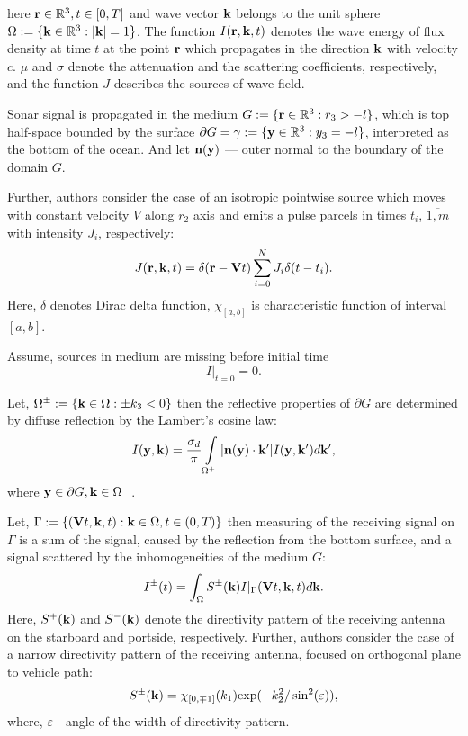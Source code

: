\documentclass{procDDs}
\begin{document}
here $\mathbf{r} \in \mathbb{R}^3, t \in [0, T]$ and wave vector $\mathbf{k}$ belongs to the unit sphere $\Omega := \{\mathbf{k} \in \mathbb{R}^3: |\mathbf{k}| = 1\}$. The function $I(\mathbf{r},\mathbf{k}, t)$ denotes the wave energy of flux density at time $t$  at the point $\mathbf{r}$ which propagates in the direction $\mathbf{k}$  with velocity $c$. $\mu$ and $\sigma$ denote the attenuation and the scattering coefficients, respectively, and the function $J$ describes the sources of wave field.

Sonar signal is propagated in the medium $G:=\{\mathbf{r} \in \mathbb{R}^3:r_3 > -l\}$, which is top half-space bounded by the surface $\partial G = \gamma := \{\mathbf{y} \in \mathbb{R}^3: y_3 = -l \}$, interpreted as the bottom of the ocean. And let $\textbf{n}(\mathbf{y})$ --- outer normal to the boundary of the domain $G$. 

Further, authors consider the case of an isotropic pointwise source which moves with constant velocity $V$ along $r_2$ axis and emits a pulse parcels in times $t_i$, $\overline{1,m}$ with intensity $J_i$, respectively: 
\begin{equation}
\label{source}
J(\mathbf{r},\mathbf{k}, t) = \delta(\mathbf{r} - \mathbf{V} t)\sum\limits_{i=0}^{N} J_i \delta(t-t_i).
\end{equation}
Here, $\delta$ denotes Dirac delta function, $\chi_{[a,b]}$ is characteristic function of interval $[a,b]$.

Assume, sources in medium are missing before initial time
\begin{equation}
\label{init_cond}
I\rvert_{t=0}=0.
\end{equation}

Let, $\Omega^\pm := \{\mathbf{k} \in \Omega: \pm k_3 < 0\}$ then the reflective properties of $\partial G$  are determined by diffuse reflection by the Lambert’s cosine law:
\begin{equation}
\label{boundary_condition}
I(\mathbf{y},\mathbf{k}) = \frac{\sigma_d}{\pi} \int\limits_{\Omega ^+}|\mathbf{n}(\mathbf{y})\cdot \mathbf{k}'| I(\mathbf{y},\mathbf{k}') d\mathbf{k}' ,
\end{equation}
where  $\mathbf{y} \in \partial G, \mathbf{k} \in \Omega^-$.


Let, $\Gamma := \{ (\mathbf{V}t, \mathbf{k}, t): \mathbf{k} \in \Omega, t \in (0,T) \}$  then measuring of the receiving signal on $\Gamma$ is a sum of the signal, caused by the reflection from the bottom surface, and a signal scattered by the inhomogeneities of the medium $G$:
\begin{multline}
	\label{sum_sig}
	I^\pm(t) = \int_{\Omega} S^\pm(\mathbf{k}) I|_{\Gamma}(\mathbf{V}t, \mathbf{k}, t)d\mathbf{k}.
\end{multline}
Here, $S^+(\mathbf{k})$ and $S^-(\mathbf{k})$ denote the directivity pattern of the receiving antenna on the starboard and portside, respectively. Further, authors consider the case of a narrow directivity pattern of the receiving antenna, focused on orthogonal plane to vehicle path:
\begin{equation}
\label{diagram}
S^\pm(\mathbf{k}) = \chi_{[0,\mp1]}(k_1)  \text{exp}(-k_2^2/\sin^2(\varepsilon)),
\end{equation}
where, $\varepsilon $ - angle of the width of directivity pattern.
\end{document}
